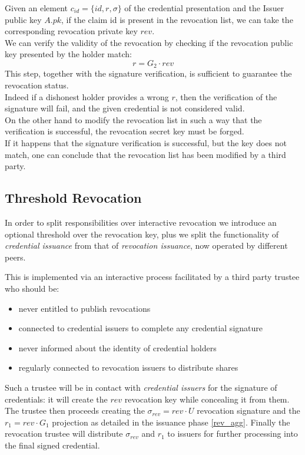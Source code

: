 Given an element $c_{id} = \{id, r, \sigma \}$ of the credential presentation and the Issuer public key $A.pk$, if the claim id is present in the revocation list, we can take the corresponding revocation private key $rev$.\\
We can verify the validity of the revocation by checking if the revocation public key presented by the holder match:
\begin{equation*}
    r = G_2 \cdot rev
\end{equation*}
This step, together with the signature verification, is sufficient to guarantee the revocation status.\\
Indeed if a dishonest holder provides a wrong $r$, then the verification of the signature will fail, and the given credential is not considered valid.\\
On the other hand to modify the revocation list in such a way that the verification is successful, the revocation secret key must be forged.\\
If it happens that the signature verification is successful, but the key does not match, one can conclude that the revocation list has been modified by a third party.

\subsection{Threshold Revocation}

In order to split responsibilities over interactive revocation we introduce an optional threshold over the revocation key, plus we split the functionality of \textit{credential issuance} from that of \textit{revocation issuance}, now operated by different peers.

This is implemented via an interactive process facilitated by a third party trustee who should be:
\begin{itemize}
    \item never entitled to publish revocations
    \item connected to credential issuers to complete any credential signature
    \item never informed about the identity of credential holders
    \item regularly connected to revocation issuers to distribute shares
\end{itemize}

Such a trustee will be in contact with \textit{credential issuers} for the signature of credentials: it will create the $rev$ revocation key while concealing it from them. The trustee then proceeds creating the $\sigma_{rev} = rev \cdot U$ revocation signature and the $r_1 = rev \cdot G_1$ projection as detailed in the issuance phase \eqref{rev_agg}. Finally the revocation trustee will distribute $\sigma_{rev}$ and $r_1$ to issuers for further processing into the final signed credential.

